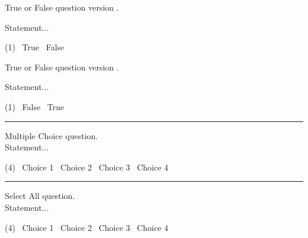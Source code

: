 \begin{question}[class=A]{2}
  \label{question:true-false-a}
  True or False question version \GetVersionID. \\
  \begin{minipage}{0.85\textwidth}
    Statement...
  \end{minipage}%
  \begin{minipage}{0.15\textwidth}
    \begin{tasks}(1)
      \task[\choice] \ True
      \task[\correctchoice] \ False
    \end{tasks}
  \end{minipage}
\end{question}

\begin{question}[class=B]{2}
  \label{question:true-false-b}
  True or False question version \GetVersionID. \\
  \begin{minipage}{0.85\textwidth}
    Statement...
  \end{minipage}%
  \begin{minipage}{0.15\textwidth}
    \begin{tasks}(1)
      \task[\correctchoice] \ False
      \task[\choice] \ True
    \end{tasks}
  \end{minipage}
\end{question}

\noindent\rule{\textwidth}{1pt}

\begin{question}[class=Z]{3}
  \label{question:multiple-choice}
  Multiple Choice question. \\
  Statement...
  \begin{tasks}(4)
    \task[\choice] \ Choice 1
    \task[\correctchoice] \ Choice 2
    \task[\choice] \ Choice 3
    \task[\choice] \ Choice 4
  \end{tasks}
\end{question}

\noindent\rule{\textwidth}{1pt}

\begin{question}[class=Z]{3}
  \label{question:select-all}
  Select All question. \\
  Statement...
  \begin{tasks}(4)
    \task[\selectall] \ Choice 1
    \task[\correctselectall] \ Choice 2
    \task[\selectall] \ Choice 3
    \task[\selectall] \ Choice 4
  \end{tasks}
\end{question}

